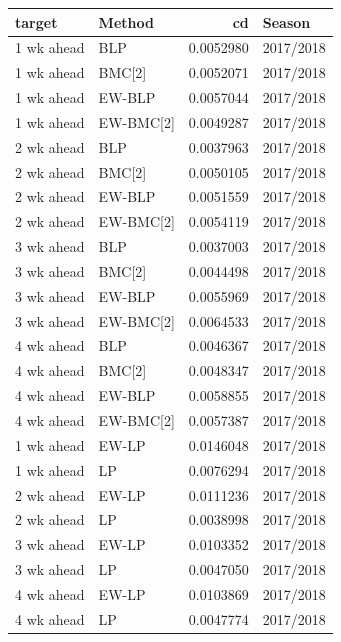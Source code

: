 \documentclass[
]{article}
\begin{document}
\begin{tabular}{l|l|r|l}
\hline
target & Method & cd & Season\\
\hline
1 wk ahead & BLP & 0.0052980 & 2017/2018\\
\hline
1 wk ahead & BMC[2] & 0.0052071 & 2017/2018\\
\hline
1 wk ahead & EW-BLP & 0.0057044 & 2017/2018\\
\hline
1 wk ahead & EW-BMC[2] & 0.0049287 & 2017/2018\\
\hline
2 wk ahead & BLP & 0.0037963 & 2017/2018\\
\hline
2 wk ahead & BMC[2] & 0.0050105 & 2017/2018\\
\hline
2 wk ahead & EW-BLP & 0.0051559 & 2017/2018\\
\hline
2 wk ahead & EW-BMC[2] & 0.0054119 & 2017/2018\\
\hline
3 wk ahead & BLP & 0.0037003 & 2017/2018\\
\hline
3 wk ahead & BMC[2] & 0.0044498 & 2017/2018\\
\hline
3 wk ahead & EW-BLP & 0.0055969 & 2017/2018\\
\hline
3 wk ahead & EW-BMC[2] & 0.0064533 & 2017/2018\\
\hline
4 wk ahead & BLP & 0.0046367 & 2017/2018\\
\hline
4 wk ahead & BMC[2] & 0.0048347 & 2017/2018\\
\hline
4 wk ahead & EW-BLP & 0.0058855 & 2017/2018\\
\hline
4 wk ahead & EW-BMC[2] & 0.0057387 & 2017/2018\\
\hline
1 wk ahead & EW-LP & 0.0146048 & 2017/2018\\
\hline
1 wk ahead & LP & 0.0076294 & 2017/2018\\
\hline
2 wk ahead & EW-LP & 0.0111236 & 2017/2018\\
\hline
2 wk ahead & LP & 0.0038998 & 2017/2018\\
\hline
3 wk ahead & EW-LP & 0.0103352 & 2017/2018\\
\hline
3 wk ahead & LP & 0.0047050 & 2017/2018\\
\hline
4 wk ahead & EW-LP & 0.0103869 & 2017/2018\\
\hline
4 wk ahead & LP & 0.0047774 & 2017/2018\\
\hline
\end{tabular}
\end{document}
